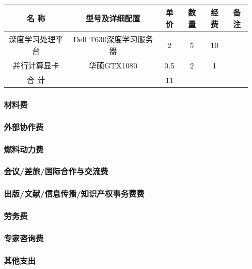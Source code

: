 \begin{tabular}{cccccc}
	\toprule
	名  称&	型号及详细配置& 单价&	数量&	经费&	备注
 \\		
	\midrule			
	深度学习处理平台&	Dell T630深度学习服务器 &	2&	5&	10	
\\
    并行计算显卡&	华硕GTX1080&	0.5&	2&	1	
\\
	合 计	&  &11 &
  &  \\
	\bottomrule
\end{tabular}

\subsubsection{材料费}

\subsubsection{外部协作费}

\subsubsection{燃料动力费}

\subsubsection{会议/差旅/国际合作与交流费}

\subsubsection{出版/文献/信息传播/知识产权事务费费}

\subsubsection{劳务费}

\subsubsection{专家咨询费}

\subsubsection{其他支出}





